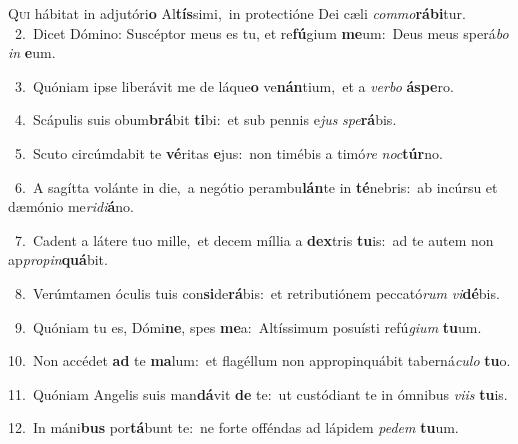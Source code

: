 \lettrine{\initial\textcolor{\initialcolor}{Q}}{ui} hábitat in adjutóri\textbf{o} Al\-\textbf{tís}\-simi,~\star in protectióne Dei cæli \textit{com}\-\textit{mo}\textbf{rá}\textbf{bi}tur.\\
{\numbfont\textcolor{\numbcolor}{~2.}}~Dicet Dómino: Suscéptor meus es tu, et re\-\textbf{fú}\-gium \textbf{me}\-um:~\star Deus meus sperá\textit{bo} \textit{in} \textbf{e}\-um.\par
{\numbfont\textcolor{\numbcolor}{~3.}}~Quóniam ipse liberávit me de láque\textbf{o} ve\-\textbf{nán}\-tium,~\star et a \textit{ver}\-\textit{bo} \textbf{ás}\-\textbf{pe}ro.\par
{\numbfont\textcolor{\numbcolor}{~4.}}~Scápulis suis obum\-\textbf{brá}\-bit \textbf{ti}\-bi:~\star et sub pennis e\textit{jus} \textit{spe}\-\textbf{rá}bis.\par
{\numbfont\textcolor{\numbcolor}{~5.}}~Scuto circúmdabit te \textbf{vé}\-ritas \textbf{e}\-jus:~\star non timébis a timó\textit{re} \textit{noc}\-\textbf{túr}no.\par
{\numbfont\textcolor{\numbcolor}{~6.}}~A sagítta volánte in die,~\dagger a negótio perambu\-\textbf{lán}\-te in \textbf{té}\-nebris:~\star ab incúrsu et dæmónio me\-\textit{ri}\-\textit{di}\textbf{á}no.\par
{\numbfont\textcolor{\numbcolor}{~7.}}~Cadent a látere tuo mille,~\dagger et decem míllia a \textbf{dex}\-tris \textbf{tu}\-is:~\star ad te autem non ap\-\textit{pro}\-\textit{pin}\textbf{quá}bit.\par
{\numbfont\textcolor{\numbcolor}{~8.}}~Verúmtamen óculis tuis con\-\textbf{si}\-de\-\textbf{rá}\-bis:~\star et retributiónem peccató\textit{rum} \textit{vi}\-\textbf{dé}bis.\par
{\numbfont\textcolor{\numbcolor}{~9.}}~Quóniam tu es, Dómi\-\textbf{ne}\-, spes \textbf{me}\-a:~\star Altíssimum posuísti refú\-\textit{gi}\-\textit{um} \textbf{tu}\-um.\par
{\numbfont\textcolor{\numbcolor}{10.}}~Non accédet \textbf{ad} te \textbf{ma}\-lum:~\star et flagéllum non appropinquábit taberná\-\textit{cu}\-\textit{lo} \textbf{tu}\-o.\par
{\numbfont\textcolor{\numbcolor}{11.}}~Quóniam Angelis suis man\-\textbf{dá}\-vit \textbf{de} te:~\star ut custódiant te in ómnibus \textit{vi}\-\textit{is} \textbf{tu}\-is.\par
{\numbfont\textcolor{\numbcolor}{12.}}~In máni\textbf{bus} por\-\textbf{tá}\-bunt te:~\star ne forte offéndas ad lápidem \textit{pe}\-\textit{dem} \textbf{tu}\-um.\par
